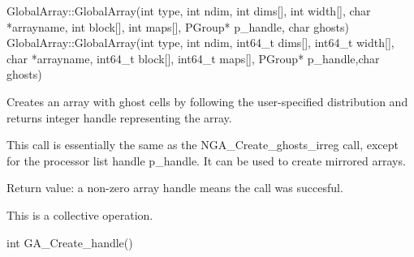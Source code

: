 \documentclass[12pt]{article}
\begin{document}
\begin{cxxapi}
\begin{cxxcode}
GlobalArray::GlobalArray(int type, int ndim, int dims[], int width[],
                         char *arrayname, int block[], int maps[],
                         PGroup* p_handle, char ghosts)
GlobalArray::GlobalArray(int type, int ndim, int64_t dims[], 
                         int64_t width[], char *arrayname, 
                         int64_t block[], int64_t maps[],
                         PGroup* p_handle,char ghosts)
\end{cxxcode}
\begin{funcargs}
\end{funcargs}
\end{cxxapi}
\dcoll

\begin{desc}

Creates an array with ghost cells by following the user-specified distribution
and returns integer handle representing the array.

This call is essentially the same as the NGA_Create_ghosts_irreg call, except
for the processor list handle p_handle. It can be used to create mirrored arrays.

Return value: a non-zero array handle means the call was succesful.

This is a collective operation.

\end{desc}



\begin{capi}
\begin{ccode}
int GA_Create_handle()
\end{ccode}
\end{capi}
\end{document}
